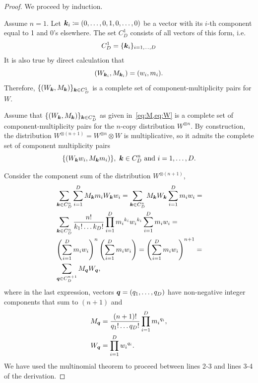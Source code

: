 \documentclass[pra,
aps,
twocolumn,
superscriptaddress,
groupedaddress,
nofootinbib,
reprint
]{revtex4-1}
\begin{document}
\begin{proof}
	We proceed by induction.
	
	Assume $n = 1$.
	Let $\bm{k}_i \coloneqq (0,\dots,0,1,0,\dots,0)$ be a vector with its $i$-th component equal to 1 and 0's elsewhere.
	The set $C_D^1$ consists of all vectors of this form, i.e. 
\begin{equation*}
	C_D^1 = \{ \bm{k}_i \}_{i=1,\dots,D}
\end{equation*}
	It is also true by direct calculation that
\begin{equation*}
	\left( W_{\bm{k}_i}, M_{\bm{k}_i} \right) = (w_i, m_i).
\end{equation*}
Therefore, $\{ (W_{\bm{k}}, M_{\bm{k}}) \}_{\bm{k} \in C_D^1}$ is a complete set of component-multiplicity pairs for $W$.

	Assume that $\{(W_{\bm{k}}, M_{\bm{k}})\}_{\bm{k} \in C_D^n}$ as given in~\cref{eq:M,eq:W} is a complete set of component-multiplicity pairs for the $n$-copy distribution $W^{\otimes n}$.
	By construction, the distribution $W^{\otimes (n+1)} = W^{\otimes n} \otimes W$ is multiplicative, so it admits the complete set of component multiplicity pairs
\begin{equation}
	\{(W_{\bm{k}} w_i, M_{\bm{k}} m_i)\},\ \bm{k} \in C_D^n \text{ and } i=1,\dots,D.
\end{equation}
	
	Consider the component sum of the distribution $W^{\otimes (n+1)}$,
\begin{align*}
	&\sum_{\bm{k} \in C_D^n}\sum_{i=1}^D M_{\bm{k}} m_i W_{\bm{k}} w_i = \sum_{\bm{k} \in C_D^n} M_{\bm{k}}W_{\bm{k}} \sum_{i=1}^D m_i w_i =\\
	&\sum_{\bm{k} \in C_D^n} \frac{n!}{k_1!\dots k_D!} \prod\limits_{i=1}^D {m_i}^{k_i}{w_i}^{k_i} \sum_{i=1}^D m_i w_i =\\
	&\left( \sum_{i=1}^D m_i w_i \right)^n \left( \sum_{i=1}^D m_i w_i \right) = \left( \sum_{i=1}^D m_i w_i \right)^{n+1} =\\
	&\sum_{\bm{q} \in C_D^{n+1}} M_{\bm{q}}W_{\bm{q}},
\end{align*}
where in the last expression, vectors $\bm{q} = (q_1, \dots, q_D)$ have non-negative integer components that sum to $(n+1)$ and 
\begin{align*}
	M_{\bm{q}} &= \frac{(n+1)!}{q_1!\dots q_D!} \prod\limits_{i=1}^D {m_i}^{q_i},\\
	W_{\bm{q}} &= \prod\limits_{i=1}^D {w_i}^{q_i}.
\end{align*}
We have used the multinomial theorem to proceed between lines 2-3 and lines 3-4 of the derivation.


\end{proof}
\end{document}
